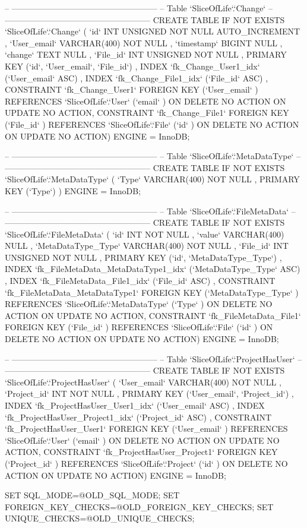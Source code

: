 \begin{spverbatim}
-- -----------------------------------------------------
-- Table `SliceOfLife`.`Change`
-- -----------------------------------------------------
CREATE  TABLE IF NOT EXISTS `SliceOfLife`.`Change` (
  `id` INT UNSIGNED NOT NULL AUTO_INCREMENT ,
  `User_email` VARCHAR(400) NOT NULL ,
  `timestamp` BIGINT NULL ,
  `change` TEXT NULL ,
  `File_id` INT UNSIGNED NOT NULL ,
  PRIMARY KEY (`id`, `User_email`, `File_id`) ,
  INDEX `fk_Change_User1_idx` (`User_email` ASC) ,
  INDEX `fk_Change_File1_idx` (`File_id` ASC) ,
  CONSTRAINT `fk_Change_User1`
    FOREIGN KEY (`User_email` )
    REFERENCES `SliceOfLife`.`User` (`email` )
    ON DELETE NO ACTION
    ON UPDATE NO ACTION,
  CONSTRAINT `fk_Change_File1`
    FOREIGN KEY (`File_id` )
    REFERENCES `SliceOfLife`.`File` (`id` )
    ON DELETE NO ACTION
    ON UPDATE NO ACTION)
ENGINE = InnoDB;


-- -----------------------------------------------------
-- Table `SliceOfLife`.`MetaDataType`
-- -----------------------------------------------------
CREATE  TABLE IF NOT EXISTS `SliceOfLife`.`MetaDataType` (
  `Type` VARCHAR(400) NOT NULL ,
  PRIMARY KEY (`Type`) )
ENGINE = InnoDB;


-- -----------------------------------------------------
-- Table `SliceOfLife`.`FileMetaData`
-- -----------------------------------------------------
CREATE  TABLE IF NOT EXISTS `SliceOfLife`.`FileMetaData` (
  `id` INT NOT NULL ,
  `value` VARCHAR(400) NULL ,
  `MetaDataType_Type` VARCHAR(400) NOT NULL ,
  `File_id` INT UNSIGNED NOT NULL ,
  PRIMARY KEY (`id`, `MetaDataType_Type`) ,
  INDEX `fk_FileMetaData_MetaDataType1_idx` (`MetaDataType_Type` ASC) ,
  INDEX `fk_FileMetaData_File1_idx` (`File_id` ASC) ,
  CONSTRAINT `fk_FileMetaData_MetaDataType1`
    FOREIGN KEY (`MetaDataType_Type` )
    REFERENCES `SliceOfLife`.`MetaDataType` (`Type` )
    ON DELETE NO ACTION
    ON UPDATE NO ACTION,
  CONSTRAINT `fk_FileMetaData_File1`
    FOREIGN KEY (`File_id` )
    REFERENCES `SliceOfLife`.`File` (`id` )
    ON DELETE NO ACTION
    ON UPDATE NO ACTION)
ENGINE = InnoDB;


-- -----------------------------------------------------
-- Table `SliceOfLife`.`ProjectHasUser`
-- -----------------------------------------------------
CREATE  TABLE IF NOT EXISTS `SliceOfLife`.`ProjectHasUser` (
  `User_email` VARCHAR(400) NOT NULL ,
  `Project_id` INT NOT NULL ,
  PRIMARY KEY (`User_email`, `Project_id`) ,
  INDEX `fk_ProjectHasUser_User1_idx` (`User_email` ASC) ,
  INDEX `fk_ProjectHasUser_Project1_idx` (`Project_id` ASC) ,
  CONSTRAINT `fk_ProjectHasUser_User1`
    FOREIGN KEY (`User_email` )
    REFERENCES `SliceOfLife`.`User` (`email` )
    ON DELETE NO ACTION
    ON UPDATE NO ACTION,
  CONSTRAINT `fk_ProjectHasUser_Project1`
    FOREIGN KEY (`Project_id` )
    REFERENCES `SliceOfLife`.`Project` (`id` )
    ON DELETE NO ACTION
    ON UPDATE NO ACTION)
ENGINE = InnoDB;



SET SQL_MODE=@OLD_SQL_MODE;
SET FOREIGN_KEY_CHECKS=@OLD_FOREIGN_KEY_CHECKS;
SET UNIQUE_CHECKS=@OLD_UNIQUE_CHECKS;

\end{spverbatim}
\newpage
